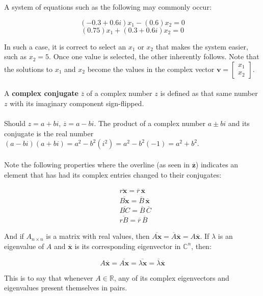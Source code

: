 \documentclass[12pt]{article}
\newcommand{\R}{\mathbb{R}}
\newcommand{\bt}[1]{\textbf{{#1}}}
\newcommand{\bm}[1]{\mathbf{{#1}}}
\newcommand{\mb}{\begin{bmatrix}}
\newcommand{\me}{\end{bmatrix}}
\newcommand{\mmb}[1]{\mathbb{{#1}}}
\begin{document}
A system of equations such as the following may commonly occur:

$$(-0.3 + 0.6i)x_1 - (0.6)x_2 = 0$$
$$(0.75)x_1 + (0.3 + 0.6i)x_2 = 0$$

In such a case, it is correct to select an $x_1$ or $x_2$ that makes the system easier, such as $x_2 = 5$. Once one value is selected, the other inherently follows.
Note that the solutions to $x_1$ and $x_2$ become the values in the complex vector $\bm{v} = \mb x_1 \\ x_2 \me$. \\ \\

A \bt{complex conjugate} $\overline{z}$ of a complex number $z$ is defined as that same number $z$ with its imaginary component sign-flipped. \\ \\

Should $z = a + bi$, $\overline{z} = a - bi$. The product of a complex number $a \pm bi$ and its conjugate is the real number
$(a - bi)(a + bi) = a^2 - b^2(i^2) = a^2 - b^2(-1) = a^2 + b^2$. \\ \\

Note the following properties where the overline (as seen in $\overline{\bm{z}}$) indicates an element that has had its complex entries changed to their conjugates:

\begin{align*}
    & \overline{r\bm{x}} = \overline{r}\,\overline{\bm{x}} \\
    & \overline{B\bm{x}} = \overline{B}\,\overline{\bm{x}} \\
    & \overline{BC} = \overline{B}\,\overline{C} \\
    & \overline{rB} = \overline{r}\,\overline{B}
\end{align*}

And if $A_{n \times n}$ is a matrix with real values, then $\overline{A\bm{x}} = \overline{A}\overline{\bm{x}} = A\overline{\bm{x}}$.
If $\lambda$ is an eigenvalue of $A$ and $\bm{\overline{x}}$ is its corresponding eigenvector in $\mmb{C}^n$, then:

$$A\overline{\bm{x}} = \overline{A\bm{x}} = \overline{\lambda\bm{x}} = \overline{\lambda}\overline{\bm{x}}$$

This is to say that whenever $A \in \R$, any of its complex eigenvectors and eigenvalues present themselves in pairs. \\ \\
\end{document}
